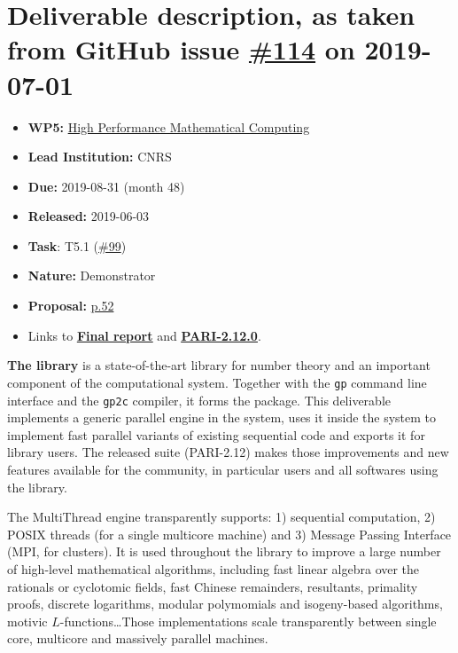 \section*{\texorpdfstring{Deliverable description, as taken from GitHub
issue
\href{https://github.com/OpenDreamKit/OpenDreamKit/issues/114}{\#114} on
2019-07-01}{Deliverable description, as taken from GitHub issue \#114 on 2019-07-01}}\label{deliverable-description-as-taken-from-github-issues-114-on-2019-07-01}

\begin{itemize}
\tightlist
\item
  \textbf{WP5:}
  \href{https://github.com/OpenDreamKit/OpenDreamKit/tree/master/WP5}{High
  Performance Mathematical Computing}
\item
  \textbf{Lead Institution:} CNRS
\item
  \textbf{Due:} 2019-08-31 (month 48)
\item
  \textbf{Released:} 2019-06-03
\item
  \textbf{Task}: T5.1
  (\href{https://github.com/OpenDreamKit/OpenDreamKit/issues/99}{\#99})
\item
  \textbf{Nature:} Demonstrator
\item
  \textbf{Proposal:}
  \href{https://github.com/OpenDreamKit/OpenDreamKit/raw/master/Proposal/proposal-www.pdf}{p.52}
\item Links to
  \underline{\textbf{\href{https://github.com/OpenDreamKit/OpenDreamKit/raw/master/WP5/D5.16/report-final.pdf}{Final report}}} and
    \underline{\textbf{\href{http://pari.math.u-bordeaux.fr/pub/pari/unstable/pari-2.12.0.alpha.tar.gz}{PARI-2.12.0\vphantom{p}}}}.
\end{itemize}
\medskip

\textbf{The \Pari library} is a state-of-the-art library for number theory and
an important
component of the \Sage computational system. Together with the \texttt{gp}
command line interface and the \texttt{gp2c} compiler, it forms
the \PariGP package. This deliverable implements a generic parallel engine in
the \PariGP system, uses it inside the system to implement fast parallel
variants of existing sequential code and exports it for library users. The
released \PariGP suite (PARI-2.12) makes those improvements and new features
available for the community, in particular \Sage users and all softwares
using the \Pari library.

The MultiThread engine transparently supports: 1) sequential computation, 2)
POSIX threads (for a single multicore machine) and 3) Message Passing Interface
(MPI, for clusters). It is used throughout the library to improve a large
number of high-level mathematical algorithms, including fast linear algebra over
the rationals or cyclotomic fields, fast Chinese remainders, resultants,
primality proofs, discrete logarithms, modular polymomials and isogeny-based
algorithms, motivic $L$-functions\dots Those implementations scale
transparently between single core, multicore and massively parallel machines.
